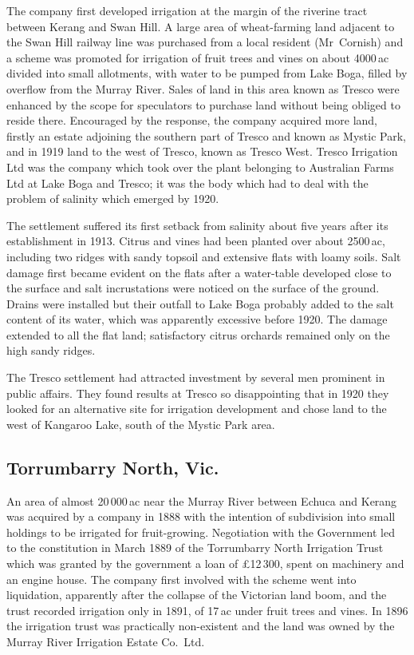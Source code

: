 The company first developed irrigation at the margin of the riverine
tract between Kerang and Swan Hill.  A large area of wheat-farming
land adjacent to the Swan Hill railway line was purchased from a local
resident (Mr~Cornish) and a scheme was promoted for irrigation of
fruit trees and vines on about 4000\,ac divided into small allotments,
with water to be pumped from Lake Boga, filled by overflow from the
Murray River.  Sales of land in this area known as Tresco were
enhanced by the scope for speculators to purchase land without being
obliged to reside there.  Encouraged by the response, the company
acquired more land, firstly an estate adjoining the southern part of
Tresco and known as Mystic Park, and in 1919 land to the west of
Tresco, known as Tresco West.  Tresco Irrigation Ltd was the company
which took over the plant belonging to Australian Farms Ltd at Lake
Boga and Tresco; it was the body which had to deal with the problem of
salinity which emerged by 1920.

The settlement suffered its first setback from salinity about five
years after its establishment in 1913.  Citrus and vines had been
planted over about 2500\,ac, including two ridges with sandy topsoil
and extensive flats with loamy soils.  Salt damage first became
evident on the flats after a water-table developed close to the
surface and salt incrustations were noticed on the surface of the
ground.  Drains were installed but their outfall to Lake Boga probably
added to the salt content of its water, which was apparently excessive
before 1920. The damage extended to all the flat land; satisfactory
citrus orchards remained only on the high sandy
ridges.

The Tresco settlement had attracted investment by several men
prominent in public affairs.  They found results at Tresco so
disappointing that in 1920 they looked for an alternative site for
irrigation development and chose land to the west of Kangaroo Lake,
south of the Mystic Park area.

\subsection*{Torrumbarry North, Vic.}

An area of almost 20\,000\,ac near the Murray River between Echuca and
Kerang was acquired by a company in 1888 with the intention of
subdivision into small holdings to be irrigated for
fruit-growing.  Negotiation with the Government led to
the constitution in March 1889 of the Torrumbarry North Irrigation
Trust which was granted by the government a loan of
\pounds12\,300, spent on machinery and an engine house.  The company
first involved with the scheme went into liquidation, apparently after
the collapse of the Victorian land boom, and the trust recorded
irrigation only in 1891, of 17\,ac under fruit trees and vines.  In
1896 the irrigation trust was practically non-existent and the land
was owned by the Murray River Irrigation Estate Co.\ Ltd.

